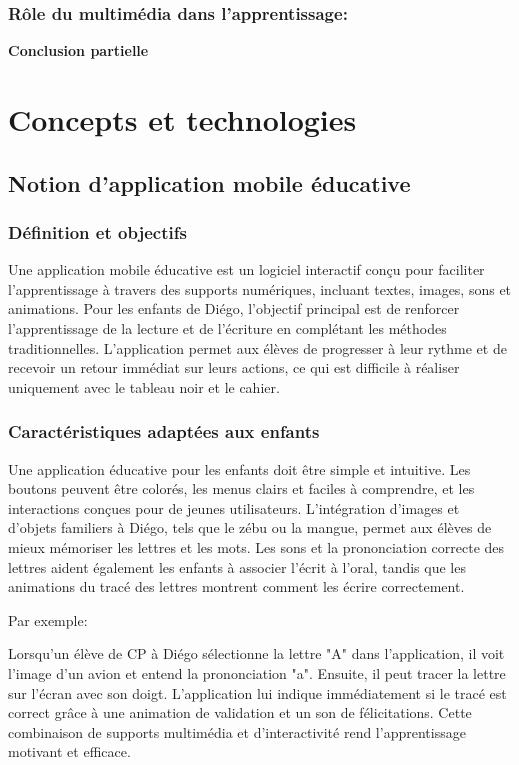 \documentclass[a4paper,oneside,12pt]{book}
\begin{document}
\subsection{Rôle du multimédia dans l'apprentissage:}

\textbf{Conclusion partielle}\\


\chapter{Concepts et technologies}\label{chap2}


\section{Notion d'application mobile éducative}
\subsection{Définition et objectifs}
Une application mobile éducative est un logiciel interactif conçu pour faciliter l'apprentissage à travers des supports numériques, incluant textes, images, sons et animations. Pour les enfants de Diégo, l'objectif principal est de renforcer l'apprentissage de la lecture et de l'écriture en complétant les méthodes traditionnelles. L'application permet aux élèves de progresser à leur rythme et de recevoir un retour immédiat sur leurs actions, ce qui est difficile à réaliser uniquement avec le tableau noir et le cahier.


\subsection{Caractéristiques adaptées aux enfants}
Une application éducative pour les enfants doit être simple et intuitive. Les boutons peuvent être colorés, les menus clairs et faciles à comprendre, et les interactions conçues pour de jeunes utilisateurs. L'intégration d'images et d'objets familiers à Diégo, tels que le zébu ou la mangue, permet aux élèves de mieux mémoriser les lettres et les mots. Les sons et la prononciation correcte des lettres aident également les enfants à associer l'écrit à l'oral, tandis que les animations du tracé des lettres montrent comment les écrire correctement.

Par exemple:

Lorsqu'un élève de CP à Diégo sélectionne la lettre "A" dans l'application, il voit l'image d'un avion et entend la prononciation "a". Ensuite, il peut tracer la lettre sur l'écran avec son doigt. L'application lui indique immédiatement si le tracé est correct grâce à une animation de validation et un son de félicitations. Cette combinaison de supports multimédia et d'interactivité rend l'apprentissage motivant et efficace.
\end{document}
